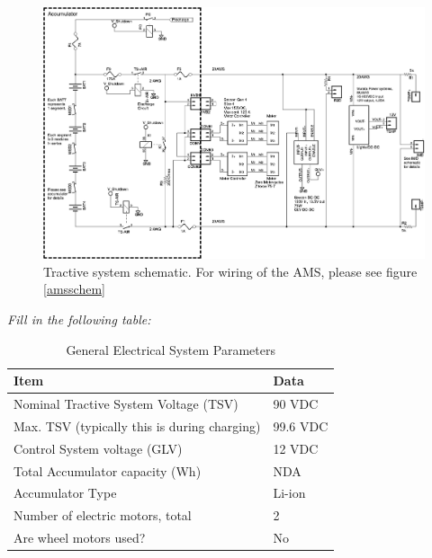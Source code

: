 \documentclass{article}
\begin{document}
                \begin{figure}
            \includegraphics[width=\textheight]{tractiveblock}
            \caption{Tractive system schematic. For wiring of the AMS, please see figure \ref{amsschem}}
            \label{tractiveschem}
        \end{figure}
\newpage

\newpage



\textit{Fill in the following table:}

    \begin{table}[H]
        \centering
        \begin{adjustbox}{max width=\textwidth}
        \begin{tabular}{|l|l|}
        \hline
        Item & Data \\ \hline
        Nominal Tractive System Voltage (TSV) & 90 VDC \\ \hline
        Max. TSV (typically this is during charging) & 99.6 VDC \\ \hline
        Control System voltage (GLV) & 12 VDC \\ \hline
        Total Accumulator capacity (Wh) & NDA \\ \hline
        Accumulator Type & Li-ion \\ \hline
        Number of electric motors, total & 2 \\ \hline
        Are wheel motors used? & No \\ \hline
        \end{tabular}
        \end{adjustbox}
        \caption{General Electrical System Parameters}
        \label{generalsystemtable}
    \end{table}
\end{document}
